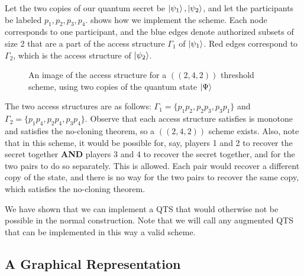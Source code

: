 Let the two copies of our quantum secret be $\ket{\psi_1}, \ket{\psi_2}$, and let the participants be labeled $p_1, p_2, p_3, p_4$.  shows how we implement the scheme. Each node corresponds to one participant, and the blue edges denote authorized subsets of size 2 that are a part of the access structure $\Gamma_1$ of $\ket{\psi_1}$. Red edges correspond to $\Gamma_2$, which is the access structure of $\ket{\psi_2}$.


\begin{figure}[H]
	\begin{center}
	\end{center}
	\caption{An image of the access structure for a $((2,4,2))$ threshold scheme, using two copies of the quantum state $\ket{\Psi}$}
	\label{fig:2-4-2}
\end{figure}

The two access structures are as follows: $\Gamma_1 = \{p_1p_2,p_2p_3,p_3p_1\}$ and $\Gamma_2 = \{p_1p_4,p_2p_4,p_3p_4\}$. Observe that each access structure satisfies is monotone and satisfies the no-cloning theorem, so a $((2,4,2))$ scheme exists. Also, note that in this scheme, it would be possible for, say, players 1 and 2 to recover the secret together \textbf{AND} players 3 and 4 to recover the secret together, and for the two pairs to do so separately. This is allowed. Each pair would recover a different copy of the state, and there is no way for the two pairs to recover the same copy, which satisfies the no-cloning theorem.

We have shown that we can implement a QTS that would otherwise not be possible in the normal construction. Note that we will call any augmented QTS that can be implemented in this way a valid scheme.

\subsection{A Graphical Representation}
\label{ssec:graphical-rep}

